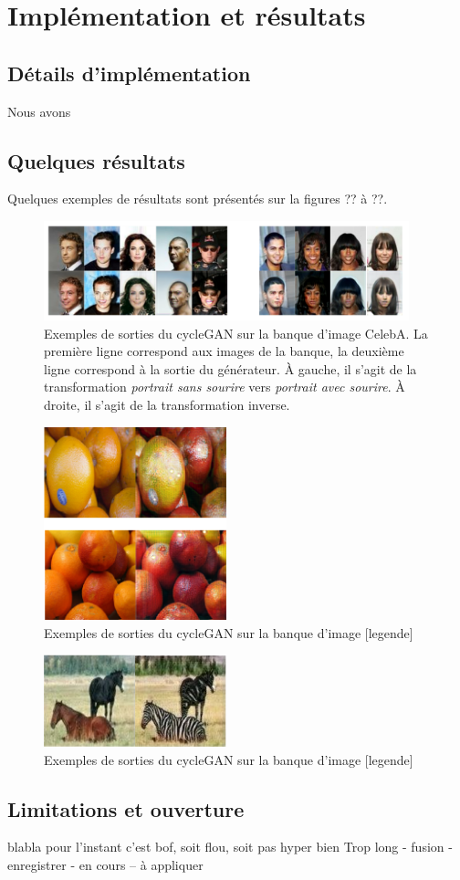\section{Implémentation et résultats}

\subsection{Détails d'implémentation}

Nous avons

\subsection{Quelques résultats}

Quelques exemples de résultats sont présentés sur la figures ?? à ??.

\begin{figure}[!h]
\centering
\includegraphics[width=300pt]{"images/cycle"}
\caption{Exemples de sorties du cycleGAN sur la banque d'image CelebA. La première ligne correspond aux images de la banque, la deuxième ligne correspond à la sortie du générateur. À gauche, il s'agit de la transformation \textit{portrait sans sourire} vers \textit{portrait avec sourire}. À droite, il s'agit de la transformation inverse.}
\end{figure}

\begin{figure}[!h]
\centering
\includegraphics[width=150pt]{"images/cycleRes2"}
\caption{Exemples de sorties du cycleGAN sur la banque d'image [legende]}
\end{figure}

\begin{figure}[!h]
\centering
\includegraphics[width=150pt]{"images/cycleRes3"}
\caption{Exemples de sorties du cycleGAN sur la banque d'image [legende]}
\end{figure}

\subsection{Limitations et ouverture}

blabla pour l'instant c'est bof, soit flou, soit pas hyper bien
Trop long - fusion - enregistrer - en cours
-- à appliquer


